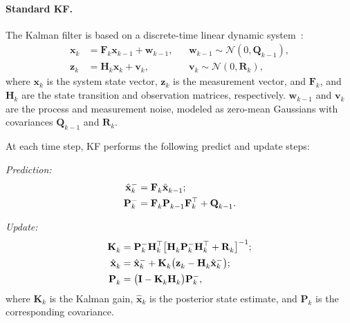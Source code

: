 \paragraph{Standard KF.} The Kalman filter is based on a discrete-time linear dynamic system~\cite{wiley_kalman}:
\begin{align}
    \mathbf{x}_k &= \mathbf{F}_{k} \mathbf{x}_{k-1} + \mathbf{w}_{k-1}, &&\mathbf{w}_{k-1} \sim \mathcal{N}(0, \mathbf{Q}_{k-1}), \\
    \mathbf{z}_k &= \mathbf{H}_k \mathbf{x}_k + \mathbf{v}_k, &&\mathbf{v}_k \sim \mathcal{N}(0, \mathbf{R}_k),
\end{align}
where $\mathbf{x}_k$ is the system state vector, $\mathbf{z}_k$ is the measurement vector, and $\mathbf{F}_k$, and $\mathbf{H}_k$ are the state transition and observation matrices, respectively. $\mathbf{w}_{k-1}$ and $\mathbf{v}_k$ are the process and measurement noise, modeled as zero-mean Gaussians with covariances $\mathbf{Q}_{k-1}$ and $\mathbf{R}_k$.

At each time step, KF performs the following predict and update steps:

\emph{Prediction:}
\begin{align}
    \hat{\mathbf{x}}_k^{\smash{-}} &= \mathbf{F}_k^{\vphantom{\top}} \hat{\mathbf{x}}_{k-1}^{\vphantom{\top}}; \\
    \mathbf{P}_k^{\smash{-}} &= \mathbf{F}_k^{\vphantom{\top}} \mathbf{P}_{k-1}^{\vphantom{\top}} \mathbf{F}_k^\top + \mathbf{Q}_{k-1}^{\vphantom{\top}}.
\end{align}

\emph{Update:}
\begin{align}
    \mathbf{K}_k^{\vphantom{\top}} &= \mathbf{P}_k^{\smash{-}} \mathbf{H}_k^\top \bigl[ \mathbf{H}_k^{\vphantom{\top}} \mathbf{P}_k^{\smash{-}} \mathbf{H}_k^\top + \mathbf{R}_k^{\vphantom{\top}} \bigr]^{-1}; \\
    \hat{\mathbf{x}}_k^{\vphantom{\top}} &= \hat{\mathbf{x}}_k^{\smash{-}} + \mathbf{K}_k^{\vphantom{\top}} \bigl(\mathbf{z}_k^{\vphantom{\top}} - \mathbf{H}_k^{\vphantom{\top}} \hat{\mathbf{x}}_k^{\smash{-}}\bigr); \\
    \mathbf{P}_k^{\vphantom{\top}} &= \bigl(\mathbf{I} - \mathbf{K}_k^{\vphantom{\top}} \mathbf{H}_k^{\vphantom{\top}}\bigr) \mathbf{P}_k^{\smash{-}},
\end{align}
where $\mathbf{K}_k$ is the Kalman gain, $\hat{\mathbf{x}}_k$ is the posterior state estimate, and $\mathbf{P}_k$ is the corresponding covariance.

